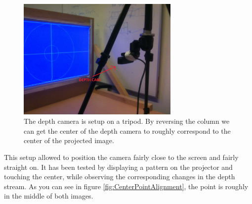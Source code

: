 \documentclass[]{article}
\begin{document}
\begin{figure}[hbtp]
    \centering
    \includegraphics[width=0.7\textwidth]{figures/tripodCamSetup.jpg}
    \caption{The depth camera is setup on a tripod. By reversing the column we can get the center of the depth camera to roughly correspond to the center of the projected image.}
    \label{fig:Tripod}
\end{figure}

This setup allowed to position the camera fairly close to the screen and fairly straight on. It has been tested by displaying a pattern on the projector and touching the center, while observing the corresponding changes in the depth stream. As you can see in figure \ref{fig:CenterPointAlignment}, the point is roughly in the middle of both images.
\end{document}

